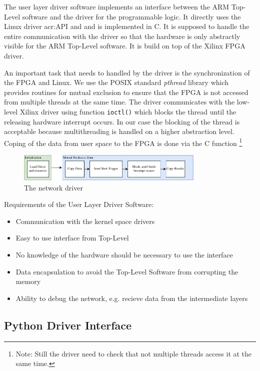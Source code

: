 The user layer driver software implements an interface between the ARM Top-Level software and the driver for the programmable logic. It directly uses the Linux driver \gls{acr:API} and and is implemented in C. It is supposed to handle the entire communication with the driver so that the hardware is only abstractly visible for the ARM Top-Level software. It is build on top of the Xilinx FPGA driver.

An important task that needs to handled by the driver is the synchronization of the FPGA and Linux. We use the POSIX standard \emph{pthread} library which provides routines for mutual exclusion to ensure that the FPGA is not accessed from multiple threads at the same time. The driver communicates with the low-level Xilinx driver using function \texttt{ioctl()} which blocks the thread until the releasing hardware interrupt occurs. In our case the blocking of the thread is acceptable because multithreading is handled on a higher abstraction level. Coping of the data from user space to the FPGA is done via the C function 
\footnote{Note: Still the driver need to check that not multiple threads access it at the same time.}


\begin{figure}[hbt]
  \centering
  \includegraphics[width=0.8\textwidth]{img/eggdriver}
  \caption{The network driver}
  \label{fig:sw-python-eggdriver-build}
\end{figure}

Requirements of the User Layer Driver Software:
\begin{itemize} 
	\item Communication with the kernel space drivers 
	\item Easy to use interface from Top-Level 
	\item No knowledge of the hardware should be necessary to use the interface
	\item Data encapsulation to avoid the Top-Level Software from corrupting the memory 
	\item Ability to debug the network, e.g. recieve data from the intermediate layers
\end{itemize}

\subsection{Python Driver Interface}
\label{sec:sw-python}

